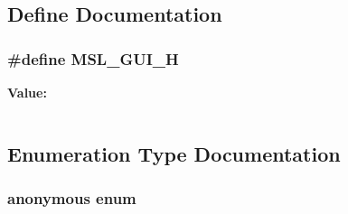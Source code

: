 \subsection{Define Documentation}
\subsubsection{\setlength{\rightskip}{0pt plus 5cm}\#define MSL\_\-GUI\_\-H}\label{gui_8h_a0}


{\bf Value:}\footnotesize\begin{verbatim}
\end{verbatim}\normalsize 


\subsection{Enumeration Type Documentation}
\subsubsection{\setlength{\rightskip}{0pt plus 5cm}anonymous enum}\label{gui_8h_a42}


